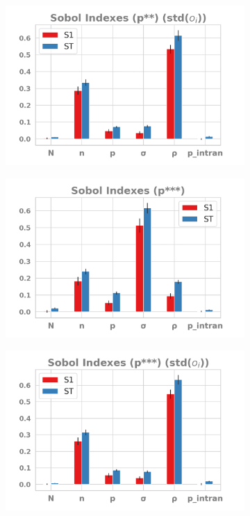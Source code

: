 \documentclass{article}
\begin{document}
\begin{figure}[H]
\begin{subfigure}[b]{0.48\textwidth}
     \end{subfigure}
    \begin{subfigure}[b]{0.48\textwidth}
      \includegraphics[width=\textwidth]{img/sobolpstar2-measurestd.png}
     \end{subfigure}
     \begin{subfigure}[b]{0.48\textwidth}
       \includegraphics[width=\textwidth]{img/sobolpstar3.png}
     \end{subfigure}
     \begin{subfigure}[b]{0.48\textwidth}
       \includegraphics[width=\textwidth]{img/sobolpstar3-measurestd.png}

\end{subfigure}
\end{figure}
\end{document}
